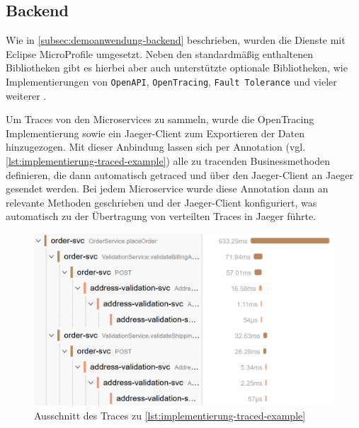 \subsection{Backend}

Wie in \autoref{subsec:demoanwendung-backend} beschrieben, wurden die Dienste mit Eclipse MicroProfile umgesetzt. Neben den standardmäßig enthaltenen Bibliotheken gibt es hierbei aber auch unterstützte optionale Bibliotheken, wie Implementierungen von \texttt{OpenAPI}, \texttt{OpenTracing}, \texttt{Fault Tolerance} und vieler weiterer \cite{EclipseMicroprofile}.

Um Traces von den Microservices zu sammeln, wurde die OpenTracing Implementierung sowie ein Jaeger-Client \cite{JaegerClient} zum Exportieren der Daten hinzugezogen. Mit dieser Anbindung lassen sich per Annotation (vgl. \autoref{lst:implementierung-traced-example}) alle zu tracenden Businessmethoden definieren, die dann automatisch getraced und über den Jaeger-Client an Jaeger gesendet werden. Bei jedem Microservice wurde diese Annotation dann an relevante Methoden geschrieben und der Jaeger-Client konfiguriert, was automatisch zu der Übertragung von verteilten Traces in Jaeger führte.



\begin{figure}
\centering
\vspace{-\baselineskip}
\includegraphics[width=\linewidth]{img/04_erstellung-poc/implementierung_jaeger-trace-example.png}
\caption{Ausschnitt des Traces zu \autoref{lst:implementierung-traced-example}}
\label{fig:implementierung_jaeger-trace-example}
\end{figure}

